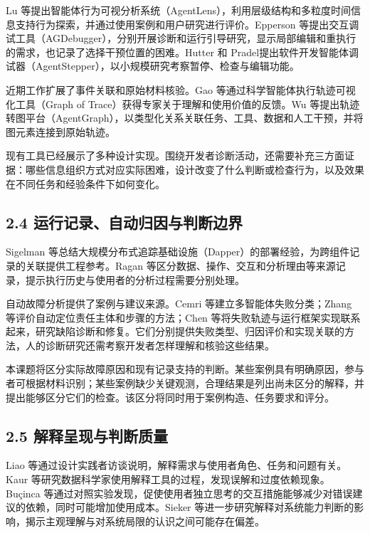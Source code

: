 Lu 等\cite{ref22}提出智能体行为可视分析系统（AgentLens），利用层级结构和多粒度时间信息支持行为探索，并通过使用案例和用户研究进行评价。Epperson 等\cite{ref02}提出交互调试工具（AGDebugger），分别开展诊断和运行引导研究，显示局部编辑和重执行的需求，也记录了选择干预位置的困难。Hutter 和 Pradel\cite{ref18}提出软件开发智能体调试器（AgentStepper），以小规模研究考察暂停、检查与编辑功能。

近期工作扩展了事件关联和原始材料核验。Gao 等\cite{ref24}通过科学智能体执行轨迹可视化工具（Graph of Trace）获得专家关于理解和使用价值的反馈。Wu 等\cite{ref23}提出轨迹转图平台（AgentGraph），以类型化关系关联任务、工具、数据和人工干预，并将图元素连接到原始轨迹。

现有工具已经展示了多种设计实现。围绕开发者诊断活动，还需要补充三方面证据：哪些信息组织方式对应实际困难，设计改变了什么判断或检查行为，以及效果在不同任务和经验条件下如何变化。

\subsection{2.4 运行记录、自动归因与判断边界}

Sigelman 等\cite{ref32}总结大规模分布式追踪基础设施（Dapper）的部署经验，为跨组件记录的关联提供工程参考。Ragan 等\cite{ref36}区分数据、操作、交互和分析理由等来源记录，提示执行历史与使用者的分析过程需要分别处理。

自动故障分析提供了案例与建议来源。Cemri 等\cite{cemri2025mast}建立多智能体失败分类；Zhang 等\cite{ref03}评价自动定位责任主体和步骤的方法；Chen 等\cite{ref20}将失败轨迹与运行框架实现联系起来，研究缺陷诊断和修复。它们分别提供失败类型、归因评价和实现关联的方法，人的诊断研究还需考察开发者怎样理解和核验这些结果。

本课题将区分实际故障原因和现有记录支持的判断。某些案例具有明确原因，参与者可根据材料识别；某些案例缺少关键观测，合理结果是列出尚未区分的解释，并提出能够区分它们的检查。该区分将同时用于案例构造、任务要求和评分。

\subsection{2.5 解释呈现与判断质量}

Liao 等\cite{ref49}通过设计实践者访谈说明，解释需求与使用者角色、任务和问题有关。Kaur 等\cite{ref50}研究数据科学家使用解释工具的过程，发现误解和过度依赖现象。Buçinca 等\cite{ref55}通过对照实验发现，促使使用者独立思考的交互措施能够减少对错误建议的依赖，同时可能增加使用成本。Sieker 等\cite{ref56}进一步研究解释对系统能力判断的影响，揭示主观理解与对系统局限的认识之间可能存在偏差。

